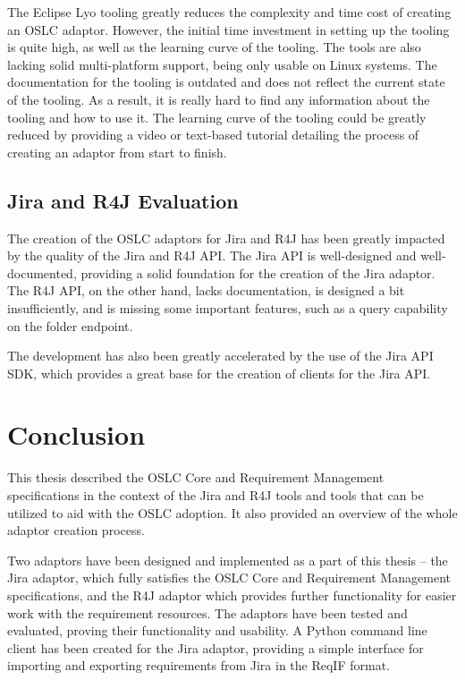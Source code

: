 The Eclipse Lyo tooling greatly reduces the complexity and time cost of creating an OSLC adaptor. However, the initial time investment in setting up the tooling is quite high, as well as the learning curve of the tooling. The tools are also lacking solid multi-platform support, being only usable on Linux systems. The documentation for the tooling is outdated and does not reflect the current state of the tooling. As a result, it is really hard to find any information about the tooling and how to use it. The learning curve of the tooling could be greatly reduced by providing a video or text-based tutorial detailing the process of creating an adaptor from start to finish.

\section{Jira and R4J Evaluation}
The creation of the OSLC adaptors for Jira and R4J has been greatly impacted by the quality of the Jira and R4J API. The Jira API is well-designed and well-documented, providing a solid foundation for the creation of the Jira adaptor. The R4J API, on the other hand, lacks documentation, is designed a bit insufficiently, and is missing some important features, such as a query capability on the folder endpoint.

The development has also been greatly accelerated by the use of the Jira API SDK, which provides a great base for the creation of clients for the Jira API.


\chapter{Conclusion}
\label{chapter:conclusion}
This thesis described the OSLC Core and Requirement Management specifications in the context of the Jira and R4J tools and tools that can be utilized to aid with the OSLC adoption. It also provided an overview of the whole adaptor creation process.

Two adaptors have been designed and implemented as a part of this thesis -- the Jira adaptor, which fully satisfies the OSLC Core and Requirement Management specifications, and the R4J adaptor which provides further functionality for easier work with the requirement resources. The adaptors have been tested and evaluated, proving their functionality and usability. A Python command line client has been created for the Jira adaptor, providing a simple interface for importing and exporting requirements from Jira in the ReqIF format.


